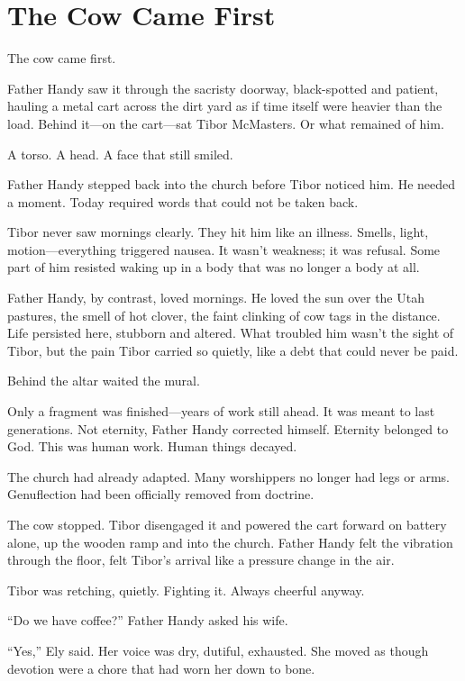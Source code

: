 \chapter{The Cow Came First}

The cow came first.

Father Handy saw it through the sacristy doorway, black-spotted and patient, hauling a metal cart across the dirt yard as if time itself were heavier than the load. Behind it—on the cart—sat Tibor McMasters. Or what remained of him.

A torso. A head. A face that still smiled.

Father Handy stepped back into the church before Tibor noticed him. He needed a moment. Today required words that could not be taken back.

Tibor never saw mornings clearly. They hit him like an illness. Smells, light, motion—everything triggered nausea. It wasn’t weakness; it was refusal. Some part of him resisted waking up in a body that was no longer a body at all.

Father Handy, by contrast, loved mornings. He loved the sun over the Utah pastures, the smell of hot clover, the faint clinking of cow tags in the distance. Life persisted here, stubborn and altered. What troubled him wasn’t the sight of Tibor, but the pain Tibor carried so quietly, like a debt that could never be paid.

Behind the altar waited the mural.

Only a fragment was finished—years of work still ahead. It was meant to last generations. Not eternity, Father Handy corrected himself. Eternity belonged to God. This was human work. Human things decayed.

The church had already adapted. Many worshippers no longer had legs or arms. Genuflection had been officially removed from doctrine.

The cow stopped. Tibor disengaged it and powered the cart forward on battery alone, up the wooden ramp and into the church. Father Handy felt the vibration through the floor, felt Tibor’s arrival like a pressure change in the air.

Tibor was retching, quietly. Fighting it. Always cheerful anyway.

“Do we have coffee?” Father Handy asked his wife.

“Yes,” Ely said. Her voice was dry, dutiful, exhausted. She moved as though devotion were a chore that had worn her down to bone.

